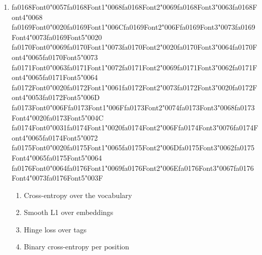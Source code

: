\documentclass[12pt]{article}
\begin{document}
\begin{enumerate}[label=Q\arabic*.]
 \item {\csname fa0168Font0\endcsname\char"0057}{\csname fa0168Font1\endcsname\char"0068}{\csname fa0168Font2\endcsname\char"0069}{\csname fa0168Font3\endcsname\char"0063}{\csname fa0168Font4\endcsname\char"0068} {\csname fa0169Font0\endcsname\char"0020}{\csname fa0169Font1\endcsname\char"006C}{\csname fa0169Font2\endcsname\char"006F}{\csname fa0169Font3\endcsname\char"0073}{\csname fa0169Font4\endcsname\char"0073}{\csname fa0169Font5\endcsname\char"0020} {\csname fa0170Font0\endcsname\char"0069}{\csname fa0170Font1\endcsname\char"0073}{\csname fa0170Font2\endcsname\char"0020}{\csname fa0170Font3\endcsname\char"0064}{\csname fa0170Font4\endcsname\char"0065}{\csname fa0170Font5\endcsname\char"0073} {\csname fa0171Font0\endcsname\char"0063}{\csname fa0171Font1\endcsname\char"0072}{\csname fa0171Font2\endcsname\char"0069}{\csname fa0171Font3\endcsname\char"0062}{\csname fa0171Font4\endcsname\char"0065}{\csname fa0171Font5\endcsname\char"0064} {\csname fa0172Font0\endcsname\char"0020}{\csname fa0172Font1\endcsname\char"0061}{\csname fa0172Font2\endcsname\char"0073}{\csname fa0172Font3\endcsname\char"0020}{\csname fa0172Font4\endcsname\char"0053}{\csname fa0172Font5\endcsname\char"006D} {\csname fa0173Font0\endcsname\char"006F}{\csname fa0173Font1\endcsname\char"006F}{\csname fa0173Font2\endcsname\char"0074}{\csname fa0173Font3\endcsname\char"0068}{\csname fa0173Font4\endcsname\char"0020}{\csname fa0173Font5\endcsname\char"004C} {\csname fa0174Font0\endcsname\char"0031}{\csname fa0174Font1\endcsname\char"0020}{\csname fa0174Font2\endcsname\char"006F}{\csname fa0174Font3\endcsname\char"0076}{\csname fa0174Font4\endcsname\char"0065}{\csname fa0174Font5\endcsname\char"0072} {\csname fa0175Font0\endcsname\char"0020}{\csname fa0175Font1\endcsname\char"0065}{\csname fa0175Font2\endcsname\char"006D}{\csname fa0175Font3\endcsname\char"0062}{\csname fa0175Font4\endcsname\char"0065}{\csname fa0175Font5\endcsname\char"0064} {\csname fa0176Font0\endcsname\char"0064}{\csname fa0176Font1\endcsname\char"0069}{\csname fa0176Font2\endcsname\char"006E}{\csname fa0176Font3\endcsname\char"0067}{\csname fa0176Font4\endcsname\char"0073}{\csname fa0176Font5\endcsname\char"003F}
 \begin{enumerate}[label=(\Alph*)]
     \item Cross-entropy over the vocabulary
     \item Smooth L1 over embeddings
     \item Hinge loss over tags
     \item Binary cross-entropy per position
 \end{enumerate}
 

\end{enumerate}
\end{document}
